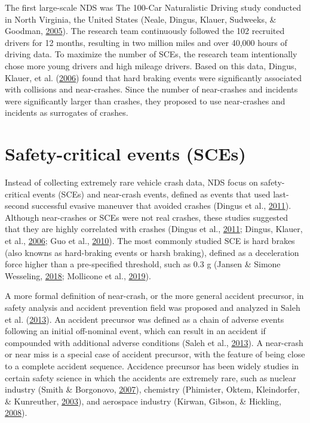 \documentclass[12pt]{book}
\numberwithin{equation}{chapter}
\begin{document}
The first large-scale NDS was The 100-Car Naturalistic Driving study conducted in North Virginia, the United States (Neale, Dingus, Klauer, Sudweeks, \& Goodman, \protect\hyperlink{ref-neale2005overview}{2005}). The research team continuously followed the 102 recruited drivers for 12 months, resulting in two million miles and over 40,000 hours of driving data. To maximize the number of SCEs, the research team intentionally chose more young drivers and high mileage drivers. Based on this data, Dingus, Klauer, et al. (\protect\hyperlink{ref-dingus2006100}{2006}) found that hard braking events were significantly associated with collisions and near-crashes. Since the number of near-crashes and incidents were significantly larger than crashes, they proposed to use near-crashes and incidents as surrogates of crashes.

\hypertarget{safety-critical-events-sces}{%
\section{Safety-critical events (SCEs)}\label{safety-critical-events-sces}}

Instead of collecting extremely rare vehicle crash data, NDS focus on safety-critical events (SCEs) and near-crash events, defined as events that used last-second successful evasive maneuver that avoided crashes (Dingus et al., \protect\hyperlink{ref-dingus2011estimating}{2011}). Although near-crashes or SCEs were not real crashes, these studies suggested that they are highly correlated with crashes (Dingus et al., \protect\hyperlink{ref-dingus2011estimating}{2011}; Dingus, Klauer, et al., \protect\hyperlink{ref-dingus2006100}{2006}; Guo et al., \protect\hyperlink{ref-guo2010near}{2010}). The most commonly studied SCE is hard brakes (also knowns as hard-braking events or harsh braking), defined as a deceleration force higher than a pre-specified threshold, such as 0.3 g (Jansen \& Simone Wesseling, \protect\hyperlink{ref-jansen2018harsh}{2018}; Mollicone et al., \protect\hyperlink{ref-mollicone2019predicting}{2019}).

A more formal definition of near-crash, or the more general accident precursor, in safety analysis and accident prevention field was proposed and analyzed in Saleh et al. (\protect\hyperlink{ref-saleh2013accident}{2013}). An accident precursor was defined as a chain of adverse events following an initial off-nominal event, which can result in an accident if compounded with additional adverse conditions (Saleh et al., \protect\hyperlink{ref-saleh2013accident}{2013}). A near-crash or near miss is a special case of accident precursor, with the feature of being close to a complete accident sequence. Accidence precursor has been widely studies in certain safety science in which the accidents are extremely rare, such as nuclear industry (Smith \& Borgonovo, \protect\hyperlink{ref-smith2007decision}{2007}), chemistry (Phimister, Oktem, Kleindorfer, \& Kunreuther, \protect\hyperlink{ref-phimister2003near}{2003}), and aerospace industry (Kirwan, Gibson, \& Hickling, \protect\hyperlink{ref-kirwan2008human}{2008}).
\end{document}
